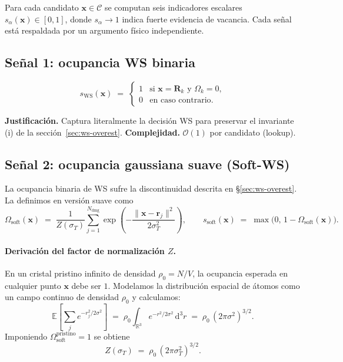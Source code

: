 \documentclass[11pt,a4paper]{article}
\theoremstyle{remark}
\begin{document}
Para cada candidato $\mathbf{x} \in \mathcal{C}$ se computan seis
indicadores escalares $s_\alpha(\mathbf{x}) \in [0,1]$, donde
$s_\alpha \to 1$ indica fuerte evidencia de vacancia. Cada señal
está respaldada por un argumento físico independiente.

\subsection{Señal 1: ocupancia WS binaria}
\label{sec:sig-ws}

\begin{equation}
  s_\text{WS}(\mathbf{x}) \;=\;
  \begin{cases}
    1 & \text{si } \mathbf{x} = \mathbf{R}_k \text{ y } \Omega_k = 0,\\
    0 & \text{en caso contrario}.
  \end{cases}
  \label{eq:sig-ws}
\end{equation}

\textbf{Justificación.} Captura literalmente la decisión WS para
preservar el invariante (i) de la sección~\ref{sec:ws-overest}.
\textbf{Complejidad.} $\mathcal{O}(1)$ por candidato (lookup).

\subsection{Señal 2: ocupancia gaussiana suave (Soft-WS)}
\label{sec:sig-softws}

La ocupancia binaria de WS sufre la discontinuidad descrita en
\S\ref{sec:ws-overest}. La definimos en versión suave como
\begin{equation}
  \Omega_\text{soft}(\mathbf{x}) \;=\;
  \frac{1}{Z(\sigma_T)} \sum_{j=1}^{N_\text{dmg}}
  \exp\!\left( -\frac{\|\mathbf{x} - \mathbf{r}_j\|^2}{2\sigma_T^2} \right),
  \qquad
  s_\text{soft}(\mathbf{x}) \;=\; \max\!\bigl(0,\, 1 - \Omega_\text{soft}(\mathbf{x})\bigr).
  \label{eq:sig-soft}
\end{equation}

\paragraph{Derivación del factor de normalización $Z$.}
En un cristal pristino infinito de densidad $\rho_0 = N/V$, la ocupancia
esperada en cualquier punto $\mathbf{x}$ debe ser $1$. Modelamos la
distribución espacial de átomos como un campo continuo de densidad
$\rho_0$ y calculamos:
\begin{equation}
  \mathbb{E}\!\left[\sum_j e^{-r_j^2/2\sigma^2}\right]
  \;=\; \rho_0 \int_{\mathbb{R}^3} e^{-r^2/2\sigma^2}\,\mathrm{d}^3 r
  \;=\; \rho_0\,(2\pi\sigma^2)^{3/2}.
\end{equation}
Imponiendo $\Omega_\text{soft}^\text{pristino} = 1$ se obtiene
\begin{equation}
  Z(\sigma_T) \;=\; \rho_0\,(2\pi\sigma_T^2)^{3/2}.
  \label{eq:sig-soft-Z}
\end{equation}
\end{document}
